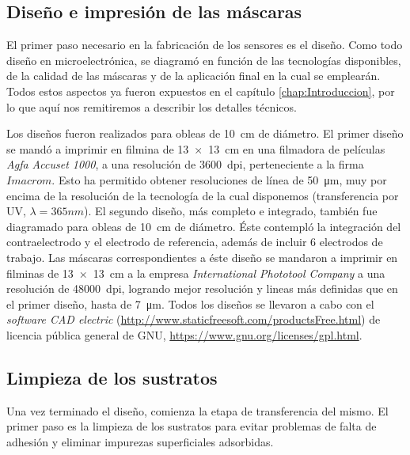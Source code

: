 	\subsection{Diseño e impresión de las máscaras}\label{sec:impresion_mascaras}

		El primer paso necesario en la fabricación de los sensores es el diseño. Como todo diseño en microelectrónica, se diagramó en función de las tecnologías disponibles, de la calidad de las máscaras y de la aplicación final en la cual se emplearán. Todos estos aspectos ya fueron expuestos en el capítulo \ref{chap:Introduccion}, por lo que aquí nos remitiremos a describir los detalles técnicos.

		Los diseños fueron realizados para obleas de \SI{10}{\cm} de diámetro. El primer diseño se mandó a imprimir en filmina de \SI{13x13}{\cm} en una filmadora de películas \textit{Agfa Accuset 1000}, a una resolución de \SI{3600}{dpi}, perteneciente a la firma $Imacrom$. Esto ha permitido obtener resoluciones de línea de \SI{50}{\um}, muy por encima de la resolución de la tecnología de la cual disponemos (transferencia por UV, $\lambda=365nm$). El segundo diseño, más completo e integrado, también fue diagramado para obleas de \SI{10}{\cm} de diámetro. Éste contempló la integración del contraelectrodo y el electrodo de referencia, además de incluir 6 electrodos de trabajo. Las máscaras correspondientes a éste diseño se mandaron a imprimir en filminas de \SI{13x13}{\cm} a la empresa \textit{International Phototool Company} a una resolución de \SI{48000}{dpi}, logrando mejor resolución y lineas más definidas que en el primer diseño, hasta de \SI{7}{\um}. Todos los diseños se llevaron a cabo con el \textit{software CAD electric} (\url{http://www.staticfreesoft.com/productsFree.html}) de licencia pública general de GNU, \url{https://www.gnu.org/licenses/gpl.html}. 
				
	\subsection{Limpieza de los sustratos}\label{sec:limpieza}
			
			Una vez terminado el diseño, comienza la etapa de transferencia del mismo. El primer paso es la limpieza de los sustratos para evitar problemas de falta de adhesión y eliminar impurezas superficiales adsorbidas. 

